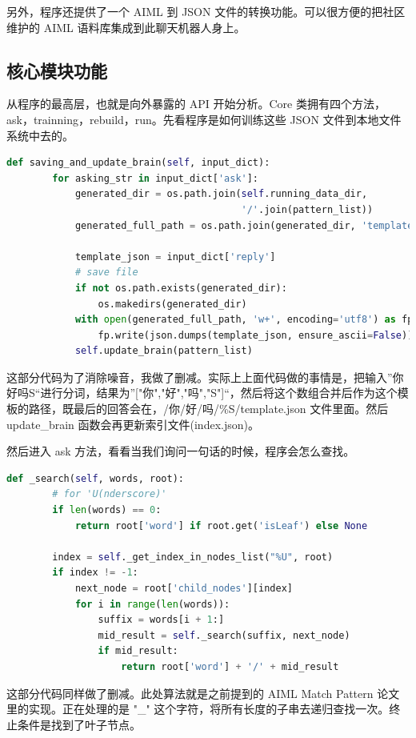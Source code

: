 \documentclass[bachelor,winfonts]{jnuthesis}
\begin{document}
另外，程序还提供了一个 AIML 到 JSON 文件的转换功能。可以很方便的把社区维护的 AIML 语料库集成到此聊天机器人身上。

\subsection{核心模块功能}

从程序的最高层，也就是向外暴露的 API 开始分析。Core 类拥有四个方法，ask，trainning，rebuild，run。先看程序是如何训练这些 JSON 文件到本地文件系统中去的。

\begin{lstlisting}[language=Python]
    def saving_and_update_brain(self, input_dict):
        for asking_str in input_dict['ask']:
            generated_dir = os.path.join(self.running_data_dir,
                                         '/'.join(pattern_list))
            generated_full_path = os.path.join(generated_dir, 'template.json')

            template_json = input_dict['reply']
            # save file
            if not os.path.exists(generated_dir):
                os.makedirs(generated_dir)
            with open(generated_full_path, 'w+', encoding='utf8') as fp:
                fp.write(json.dumps(template_json, ensure_ascii=False))
            self.update_brain(pattern_list)
\end{lstlisting}

这部分代码为了消除噪音，我做了删减。实际上上面代码做的事情是，把输入”你好吗S“进行分词，结果为”["你","好","吗","S"]“，然后将这个数组合并后作为这个模板的路径，既最后的回答会在，/你/好/吗/\%S/template.json 文件里面。然后 update\_brain 函数会再更新索引文件(index.json)。


然后进入 ask 方法，看看当我们询问一句话的时候，程序会怎么查找。

\begin{lstlisting}[language=Python]
 def _search(self, words, root):
        # for 'U(nderscore)'
        if len(words) == 0:
            return root['word'] if root.get('isLeaf') else None

        index = self._get_index_in_nodes_list("%U", root)
        if index != -1:
            next_node = root['child_nodes'][index]
            for i in range(len(words)):
                suffix = words[i + 1:]
                mid_result = self._search(suffix, next_node)
                if mid_result:
                    return root['word'] + '/' + mid_result
\end{lstlisting}

这部分代码同样做了删减。此处算法就是之前提到的 AIML Match Pattern 论文\cite{aiml-match-pattern}里的实现。正在处理的是 "\_" 这个字符，将所有长度的子串去递归查找一次。终止条件是找到了叶子节点。
\end{document}
